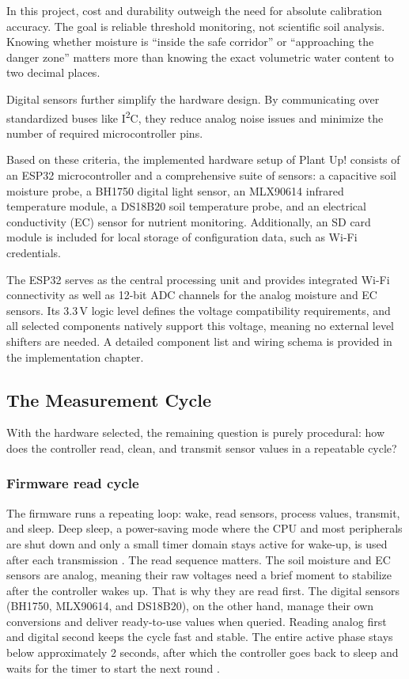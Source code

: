 In this project, cost and durability outweigh the need for absolute calibration accuracy. The goal is reliable threshold monitoring, not scientific soil analysis. Knowing whether moisture is ``inside the safe corridor'' or ``approaching the danger zone'' matters more than knowing the exact volumetric water content to two decimal places.

Digital sensors further simplify the hardware design. By communicating over standardized buses like I\textsuperscript{2}C, they reduce analog noise issues and minimize the number of required microcontroller pins.

Based on these criteria, the implemented hardware setup of Plant Up! consists of an ESP32 microcontroller and a comprehensive suite of sensors: a capacitive soil moisture probe, a BH1750 digital light sensor, an MLX90614 infrared temperature module, a DS18B20 soil temperature probe, and an electrical conductivity (EC) sensor for nutrient monitoring. Additionally, an SD card module is included for local storage of configuration data, such as Wi-Fi credentials. 

The ESP32 serves as the central processing unit and provides integrated Wi-Fi connectivity as well as 12-bit ADC channels for the analog moisture and EC sensors. Its 3.3\,V logic level defines the voltage compatibility requirements, and all selected components natively support this voltage, meaning no external level shifters are needed. A detailed component list and wiring schema is provided in the implementation chapter.

\subsection{The Measurement Cycle}

With the hardware selected, the remaining question is purely procedural: how does the controller read, clean, and transmit sensor values in a repeatable cycle?

\subsubsection*{Firmware read cycle}

The firmware runs a repeating loop: wake, read sensors, process values, transmit, and sleep. Deep sleep, a power-saving mode where the CPU and most peripherals are shut down and only a small timer domain stays active for wake-up, is used after each transmission \cite{espIdfDeepSleep}.
The read sequence matters. The soil moisture and EC sensors are analog, meaning their raw voltages need a brief moment to stabilize after the controller wakes up. That is why they are read first. The digital sensors (BH1750, MLX90614, and DS18B20), on the other hand, manage their own conversions and deliver ready-to-use values when queried. Reading analog first and digital second keeps the cycle fast and stable. The entire active phase stays below approximately 2 seconds, after which the controller goes back to sleep and waits for the timer to start the next round \cite{espIdfDeepSleep}.

